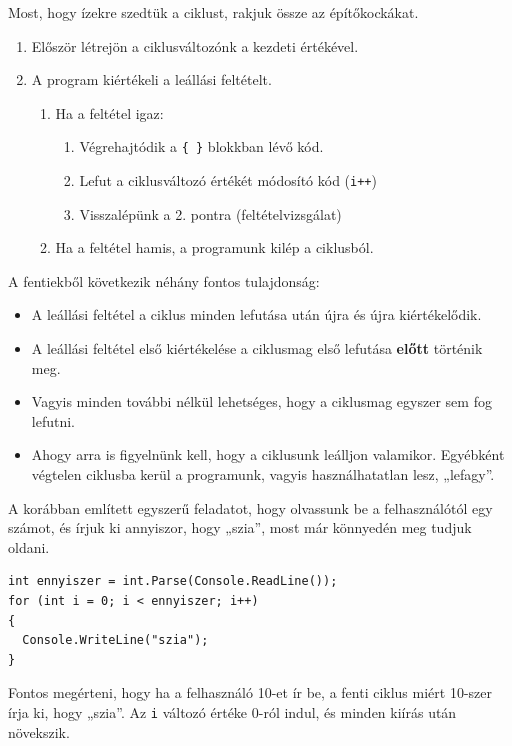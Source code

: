 \documentclass[a4paper]{article}
\begin{document}
Most, hogy ízekre szedtük a ciklust, rakjuk össze az építőkockákat.

\begin{enumerate}
	\item Először létrejön a ciklusváltozónk a kezdeti értékével.
	\item A program kiértékeli a leállási feltételt.
	\begin{enumerate}
		\item Ha a feltétel igaz:
		\begin{enumerate}
			\item Végrehajtódik a \lstinline!{ }! blokkban lévő kód.
			\item Lefut a ciklusváltozó értékét módosító kód (\lstinline{i++})
			\item Visszalépünk a 2. pontra (feltételvizsgálat)
		\end{enumerate}
		\item Ha a feltétel hamis, a programunk kilép a ciklusból.
	\end{enumerate}
\end{enumerate}

A fentiekből következik néhány fontos tulajdonság:
\begin{itemize}
	\item A leállási feltétel a ciklus minden lefutása után újra és újra kiértékelődik.
	\item A leállási feltétel első kiértékelése a ciklusmag első lefutása \textbf{előtt} történik meg.
	\item Vagyis minden további nélkül lehetséges, hogy a ciklusmag egyszer sem fog lefutni.
	\item Ahogy arra is figyelnünk kell, hogy a ciklusunk leálljon valamikor. Egyébként végtelen ciklusba kerül a programunk, vagyis használhatatlan lesz, „lefagy”.
\end{itemize}

A korábban említett egyszerű feladatot, hogy olvassunk be a felhasználótól egy számot, és írjuk ki annyiszor, hogy „szia”, most már könnyedén meg tudjuk oldani.

\begin{lstlisting}[caption=Számláló ciklus példa, label=lst:forExample]
int ennyiszer = int.Parse(Console.ReadLine());
for (int i = 0; i < ennyiszer; i++)
{
  Console.WriteLine("szia");
}
\end{lstlisting}

Fontos megérteni, hogy ha a felhasználó 10-et ír be, a fenti ciklus miért 10-szer írja ki, hogy „szia”. Az \lstinline{i} változó értéke 0-ról indul, és minden kiírás után növekszik.
\end{document}

